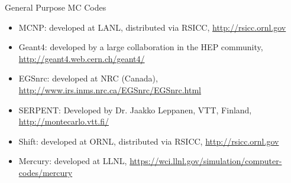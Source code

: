 \documentclass[xcolor=x11names,compress]{beamer}
\renewcommand{\(}{\begin{columns}}
\renewcommand{\)}{\end{columns}}
\newcommand{\<}[1]{\begin{column}{#1}}
\renewcommand{\>}{\end{column}}
\begin{document}
\begin{frame}{General Purpose MC Codes}

\begin{itemize}
\item \alert{MCNP}: developed at LANL, distributed via RSICC, \href{http://rsicc.ornl.gov}{http://rsicc.ornl.gov}
%

\item \alert{Geant4}: developed by a large collaboration in the HEP community, \href{ http://geant4.web.cern.ch/geant4/}{http://geant4.web.cern.ch/geant4/}

\item \alert{EGSnrc}: developed at NRC (Canada), \href{http://www.irs.inms.nrc.ca/EGSnrc/EGSnrc.html}{http://www.irs.inms.nrc.ca/EGSnrc/EGSnrc.html}

\item \alert{SERPENT}: Developed by Dr. Jaakko Leppanen, VTT, Finland, \href{ http://montecarlo.vtt.fi/}{http://montecarlo.vtt.fi/}

\item \alert{Shift}: developed at ORNL, distributed via RSICC, \href{http://rsicc.ornl.gov}{http://rsicc.ornl.gov}

\item \alert{Mercury}: developed at LLNL, \href{https://wci.llnl.gov/simulation/computer-codes/mercury}{https://wci.llnl.gov/simulation/computer-codes/mercury}

\end{itemize}

\end{frame}
\end{document}
